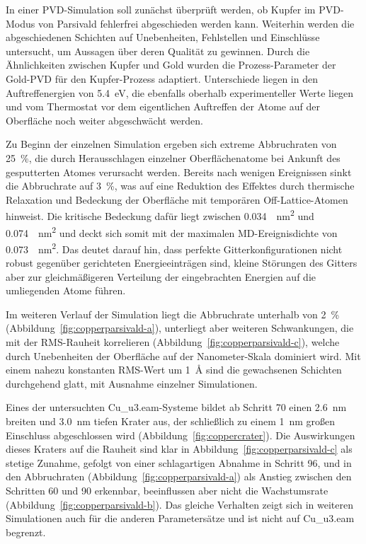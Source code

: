 In einer PVD-Simulation soll zunächst überprüft werden, ob Kupfer im PVD-Modus von Parsivald fehlerfrei abgeschieden werden kann.
Weiterhin werden die abgeschiedenen Schichten auf Unebenheiten, Fehlstellen und Einschlüsse untersucht, um Aussagen über deren Qualität zu gewinnen.
Durch die Ähnlichkeiten zwischen Kupfer und Gold wurden die Prozess-Parameter der Gold-PVD für den Kupfer-Prozess adaptiert.
Unterschiede liegen in den Auftreffenergien von \SI{5.4}{\electronvolt}, die ebenfalls oberhalb experimenteller Werte liegen und vom Thermostat vor dem eigentlichen Auftreffen der Atome auf der Oberfläche noch weiter abgeschwächt werden.

Zu Beginn der einzelnen Simulation ergeben sich extreme Abbruchraten von \SI{25}{\percent}, die durch Herausschlagen einzelner Oberflächenatome bei Ankunft des gesputterten Atomes verursacht werden.
Bereits nach wenigen Ereignissen sinkt die Abbruchrate auf \SI{3}{\percent}, was auf eine Reduktion des Effektes durch thermische Relaxation und Bedeckung der Oberfläche mit temporären Off-Lattice-Atomen hinweist.
Die kritische Bedeckung dafür liegt zwischen \SI{0.034}{\per\nano\meter\squared} und \SI{0.074}{\per\nano\meter\squared} und deckt sich somit mit der maximalen MD-Ereignisdichte von \SI{0.073}{\per\nano\meter\squared}.
Das deutet darauf hin, dass perfekte Gitterkonfigurationen nicht robust gegenüber gerichteten Energieeinträgen sind, kleine Störungen des Gitters aber zur gleichmäßigeren Verteilung der eingebrachten Energien auf die umliegenden Atome führen.

Im weiteren Verlauf der Simulation liegt die Abbruchrate unterhalb von \SI{2}{\percent} (Abbildung~\ref{fig:copperparsivald-a}), unterliegt aber weiteren Schwankungen, die mit der RMS-Rauheit korrelieren (Abbildung~\ref{fig:copperparsivald-c}), welche durch Unebenheiten der Oberfläche auf der Nanometer-Skala dominiert wird.
Mit einem nahezu konstanten RMS-Wert um \SI{1}{\angstrom} sind die gewachsenen Schichten durchgehend glatt, mit Ausnahme einzelner Simulationen.

Eines der untersuchten Cu\_u3.eam-Systeme bildet ab Schritt 70 einen \SI{2.6}{\nano\meter} breiten und \SI{3.0}{\nano\meter} tiefen Krater aus, der schließlich zu einem \SI{1}{\nano\meter} großen Einschluss abgeschlossen wird (Abbildung~\ref{fig:coppercrater}).
Die Auswirkungen dieses Kraters auf die Rauheit sind klar in Abbildung~\ref{fig:copperparsivald-c} als stetige Zunahme, gefolgt von einer schlagartigen Abnahme in Schritt 96, und in den Abbruchraten (Abbildung~\ref{fig:copperparsivald-a}) als Anstieg zwischen den Schritten 60 und 90 erkennbar, beeinflussen aber nicht die Wachstumsrate (Abbildung~\ref{fig:copperparsivald-b}).
Das gleiche Verhalten zeigt sich in weiteren Simulationen auch für die anderen Parametersätze und ist nicht auf Cu\_u3.eam begrenzt.

